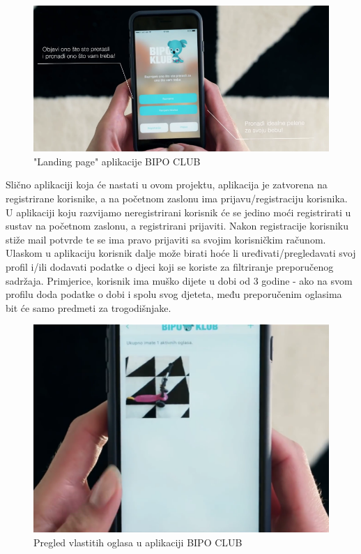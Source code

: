 		\begin{figure}[h!]
			\center
			\includegraphics{./slike/Picture2.png}
			\caption{ "Landing page" aplikacije BIPO CLUB}
			\label{fig2}
		\end{figure}
		Slično aplikaciji koja će nastati u ovom projektu, aplikacija je zatvorena na registrirane korisnike, a na početnom zaslonu ima prijavu/registraciju korisnika. \\
		\newline
		U aplikaciji koju razvijamo neregistrirani korisnik će se jedino moći registrirati u sustav na početnom zaslonu, a registrirani prijaviti. Nakon registracije korisniku stiže mail potvrde te se ima pravo prijaviti sa svojim korisničkim računom. Ulaskom u aplikaciju korisnik dalje može birati hoće li uređivati/pregledavati svoj profil i/ili dodavati podatke o djeci koji se koriste za filtriranje preporučenog sadržaja. Primjerice, korisnik ima muško dijete u dobi od 3 godine - ako na svom profilu doda podatke o dobi i spolu svog djeteta, među preporučenim oglasima bit će samo predmeti za trogodišnjake.\\
		\newline
		\begin{figure}[h!]
			\center
			\includegraphics[height=0.15\textheight]{./slike/Picture3.png}
			\caption{ Pregled vlastitih oglasa u aplikaciji BIPO CLUB}
			\label{fig3}
		\end{figure}
